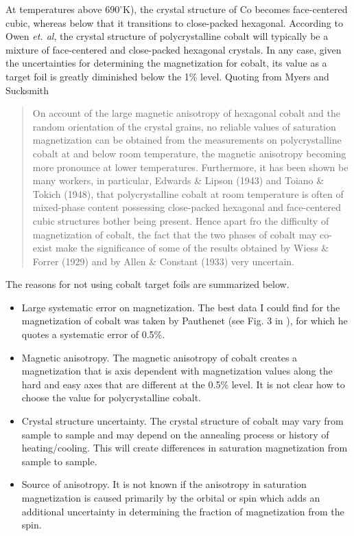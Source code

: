 \documentclass[12pt]{article}
\begin{document}
At temperatures above $690^{\circ}$K), the crystal structure of Co becomes face-centered cubic, whereas below that it transitions to close-packed hexagonal. According to Owen {\it et. al}, the crystal structure of polycrystalline cobalt will typically be a mixture of face-centered and close-packed hexagonal crystals\cite{Owen1954}. In any case, given the uncertainties for determining the magnetization for cobalt, its value as a target foil is greatly diminished below the 1\% level.  Quoting from Myers and Sucksmith \cite{Myers1951}
\begin{quote}
On account of the large magnetic anisotropy of hexagonal cobalt and the random orientation of the crystal grains, no reliable values of saturation magnetization can be obtained from the measurements on polycrystalline cobalt at and below room temperature, the magnetic anisotropy becoming more pronounce at lower temperatures. Furthermore, it has been shown be many workers, in particular, Edwards \& Lipson (1943) and Toiano \& Tokich (1948), that polycrystalline cobalt at room temperature is often of mixed-phase content possessing close-packed hexagonal and face-centered cubic structures bother being present. Hence apart fro the difficulty of magnetization of cobalt, the fact that the two phases of cobalt may co-exist make the significance of some of the results obtained by Wiess \& Forrer (1929) and by Allen \& Constant (1933) very uncertain.
\end{quote}
The reasons for not using cobalt target foils are summarized below.
\begin{itemize}
\item{Large systematic error on magnetization. The best data I could find for the magnetization of cobalt was taken by Pauthenet (see Fig. 3 in \cite{PauthenetMar1982}), for which he quotes a systematic error of 0.5\%.}
\item{Magnetic anisotropy. The magnetic anisotropy of cobalt creates a magnetization that is axis dependent with magnetization values along the hard and easy axes that are different at the  0.5\% level. It is not clear how to choose the value for polycrystalline cobalt.}
\item{Crystal structure uncertainty. The crystal structure of cobalt may vary from sample to sample and may depend on the annealing process or history of heating/cooling. This will create differences in saturation magnetization from sample to sample.}
\item{Source of anisotropy. It is not known if the anisotropy in saturation magnetization is caused primarily by the orbital or spin which adds an additional uncertainty in determining the fraction of magnetization from the spin.}  
\end{itemize}
\end{document}
